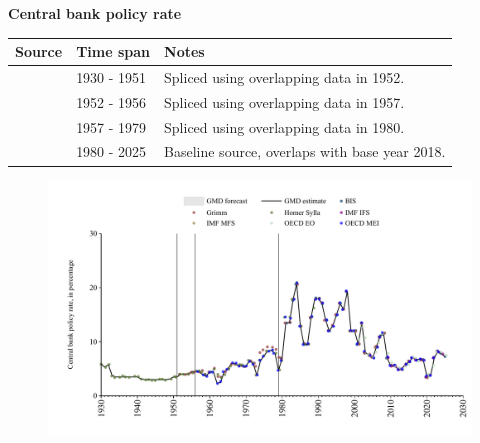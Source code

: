 \documentclass[12pt,a4paper,landscape]{article}
\begin{document}
\begin{adjustbox}{max totalsize={\paperwidth}{\paperheight},center}
\begin{minipage}[t][\textheight][t]{\textwidth}
\vspace*{0.5cm}
{}
\begin{center}
{\Large\bfseries Central bank policy rate}
\end{center}
\vspace{0.5cm}
\begin{table}[H]
\centering
\small
\begin{tabular}{|l|l|l|}
\hline
\textbf{Source} & \textbf{Time span} & \textbf{Notes} \\
\hline
\rowcolor{white}\cite{Homer_Sylla}& 1930 - 1951 &Spliced using overlapping data in 1952. \\
\rowcolor{lightgray}\cite{Grimm}& 1952 - 1956 &Spliced using overlapping data in 1957. \\
\rowcolor{white}\cite{OECD_MEI}& 1957 - 1979 &Spliced using overlapping data in 1980. \\
\rowcolor{lightgray}\cite{BIS}& 1980 - 2025 &Baseline source, overlaps with base year 2018. \\
\hline
\end{tabular}
\end{table}
\begin{figure}[H]
\centering
\includegraphics[width=\textwidth,height=0.6\textheight,keepaspectratio]{graphs/ZAF_cbrate.pdf}
\end{figure}
\end{minipage}
\end{adjustbox}
\end{document}
